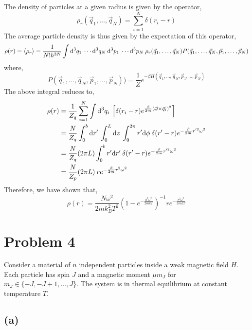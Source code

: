 \documentclass[12pt]{extarticle}
\begin{document}
The density of particles at a given radius is given by the operator,
\[ \rho_r(\vec{q}_1, \dots, \vec{q}_N) = \sum_{i = 1}^N \delta(r_i - r) \]
The average particle density is thus given by the expectation of this operator,
\begin{align*}
\rho(r) = \left< \rho_r \right> = \frac{1}{N! h^{3 N}} \int \mathrm{d}^{3} q_1 \: \cdots \mathrm{d}^{3} q_N \: \mathrm{d}^{3} p_1 \: \cdots \mathrm{d}^{3} p_N \: \rho_r(\vec{q}_1, \dots, \vec{q}_N) P(\vec{q}_1, \dots, \vec{q}_N, \vec{p}_1, \dots, \vec{p}_N)
\end{align*}
where,
\[ P(\vec{q}_1, \dots, \vec{q}_N, \vec{p}_1, \dots, \vec{p}_N)) = \frac{1}{Z} e^{-\beta H(\vec{q}_1, \dots, \vec{q}_N, \vec{p}_1, \dots, \vec{p}_N)} \]
The above integral reduces to,
\begin{align*}
\rho(r) & = \frac{1}{Z_q} \sum_{i = 1}^N \int \mathrm{d}^{3} q_i \: \left[ \delta(r_i - r) e^{\frac{\beta}{2 m} (\vec{\omega} \times \vec{q}_i)^2} \right]
\\
& = \frac{N}{Z_q} \int_0^{b} \mathrm{d}r' \: \int_{0}^L \mathrm{d}z \: \int_0^{2 \pi} r' \mathrm{d}\phi \: \delta(r' - r) e^{-\frac{\beta}{2 m} r'^2 \omega^2} 
\\
& = \frac{N}{Z_q} (2 \pi L) \int_0^b r' \mathrm{d}r' \: \delta(r' - r) e^{-\frac{\beta}{2 m} r'^2 \omega^2} 
\\
& = \frac{N}{Z_p} (2 \pi L) \: r e^{-\frac{\beta}{2 m} r^2 \omega^2} 
\end{align*}
Therefore, we have shown that,
\[ \rho(r) = \frac{N \omega^2}{2 m k_B^2 T^2} \left(1 - e^{-\frac{b^2 \omega^2}{2m k T}} \right)^{-1} r e^{-\frac{r^2 \omega^2 }{2 m k T} } \]

\section{Problem 4}

Consider a material of $n$ independent particles inside a weak magnetic field $H$. Each particle has spin $J$ and a magnetic moment $\mu m_J$ for $m_J \in \{ - J , -J + 1, \dots, J \}$. The system is in thermal equilibrium at constant temperature $T$.

\subsection{(a)}
\end{document}
